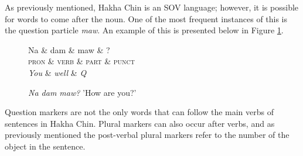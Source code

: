 \documentclass[10pt, a4paper]{article}
\begin{document}
As previously mentioned, Hakha Chin is an SOV language; however, it is possible for words to come after the noun. One of the most frequent instances of this is the question particle \emph{maw}. An example of this is presented below in Figure \ref{fig:question}.

\begin{figure}[h]
\centering
 \begin{dependency} 
   \begin{deptext}[column sep=0.4cm]
     Na \& dam \& maw \& ? \\
     \textsc{pron} \& \textsc{verb} \& \textsc{part} \& \textsc{punct}\\
     \emph{You} \& \emph{well} \& \emph{Q}\\
     \end{deptext}
 \end{dependency}
\caption{\label{fig:question}}\emph{Na dam maw?} 'How are you?'
\end{figure}

Question markers are not the only words that can follow the main verbs of sentences in Hakha Chin. Plural markers can also occur after verbs, and as previously mentioned the post-verbal plural markers refer to the number of the object in the sentence.

\end{document}
